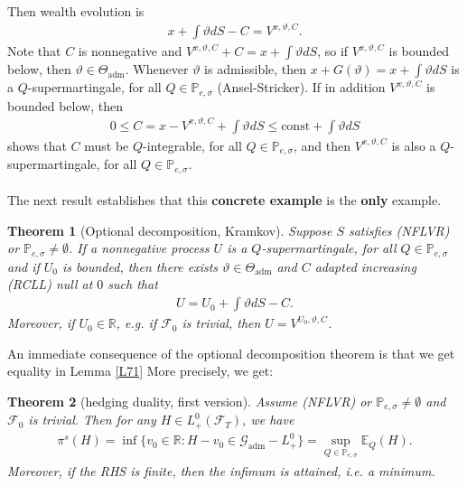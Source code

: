 \documentclass[12pt,a4paper, twoside]{article}
\newtheorem{thm}{Theorem}[section]
\theoremstyle{definition}
\newcommand{\EE}{\mathbb{E}} %
\newcommand{\PP}{\mathbb{P}} %
\begin{document}
\newpage
Then wealth evolution is 
\begin{align*}
x + \int \vartheta dS -C = V^{x, \vartheta,C}.
\end{align*}
Note that $C$ is nonnegative and $V^{x, \vartheta, C} + C = x + \int \vartheta dS$, so if $V^{x, \vartheta,C}$ is bounded below, then $\vartheta \in \Theta_\text{adm}$. Whenever $\vartheta$ is admissible, then $x + G( \vartheta) = x + \int \vartheta dS$ is a $Q$-supermartingale, for all $Q \in \PP_{e, \sigma}$ (Ansel-Stricker). If in addition $V^{x, \vartheta, C}$ is bounded below, then
\begin{align*}
0 \leq C = x- V^{x, \vartheta, C} + \int \vartheta dS \leq \text{const} + \int \vartheta dS
\end{align*}
shows that $C$ must be $Q$-integrable, for all $Q \in \PP_{e,  \sigma}$, and then $V^{x, \vartheta,C}$ is also a $Q$-supermartingale, for all $Q \in \PP_{e, \sigma}$. 
\\
\\
The next result establishes that this \textbf{concrete example} is the \textbf{only} example.
\begin{thm}[Optional decomposition, Kramkov] \label{T73} Suppose $S$ satisfies (NFLVR) or $\PP_{e, \sigma} \neq \emptyset$. If a nonnegative process $U$ is a $Q$-supermartingale, for all $Q \in \PP_{e, \sigma}$ and if $U_0$ is bounded, then there exists $\vartheta \in \Theta_\text{adm}$ and $C$ adapted increasing (RCLL) null at $0$ such that 
\begin{align*}
U = U_0 + \int \vartheta dS -C. 
\end{align*}
Moreover, if $U_0 \in \mathbb{R}$, e.g. if $\mathcal{F}_0$ is trivial, then $U= V^{U_0, \vartheta, C}$. 
\end{thm}
An immediate consequence of the optional decomposition theorem is that we get equality in Lemma \ref{L71} More precisely, we get:
\begin{thm}[hedging duality, first version] \label{T74} Assume (NFLVR) or $\PP_{e, \sigma} \neq \emptyset$ and $\mathcal{F}_0$ is trivial. Then for any $H \in L_+^0( \mathcal{F}_T)$, we have
\begin{align*}
\pi^s(H) = \inf\{ v_0 \in \mathbb{R}: H-v_0 \in \mathcal{G}_\text{adm}-L_+^0 \} = \sup_{Q \in \PP_{e, \sigma}} \EE_Q(H). 
\end{align*}
Moreover, if the RHS is finite, then the infimum is attained, i.e. a minimum. 
\end{thm}
\end{document}
